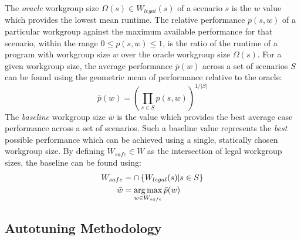 \documentclass[nonatbib,preprint,9pt]{sigplanconf}
\begin{document}



The \emph{oracle} workgroup size $\Omega(s) \in W_{legal}(s)$ of a
scenario $s$ is the $w$ value which provides the lowest mean
runtime. The relative performance $p(s,w)$ of a particular workgroup
against the maximum available performance for that scenario, within
the range $0 \le p(s,w) \le 1$, is the ratio of the runtime of a
program with workgroup size $w$ over the oracle workgroup size
$\Omega(s)$. For a given workgroup size, the average performance
$\bar{p}(w)$ across a set of scenarios $S$ can be found using the
geometric mean of performance relative to the oracle:
%
\begin{equation}
  \bar{p}(w) =
  \left(
    \prod_{s \in S} p(s, w)
  \right)^{1/|S|}
\end{equation}
%
The \emph{baseline} workgroup size $\bar{w}$ is the value which
provides the best average case performance across a set of
scenarios. Such a baseline value represents the \emph{best} possible
performance which can be achieved using a single, statically chosen
workgroup size. By defining $W_{safe} \in W$ as the intersection of
legal workgroup sizes, the baseline can be found using:
%
\begin{align}
W_{safe} &= \cap \left\{ W_{legal}(s) | s \in S \right\}\\
\bar{w} &= \operatorname*{arg\,max}_{w \in W_{safe}} \bar{p}(w)
\end{align}


\subsection{Autotuning Methodology}
\end{document}

